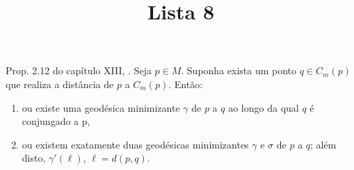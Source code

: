 



\title{Lista 8}
\maketitle

\label{section-phantom}



\noindent

\begin{exercise}
Prop. 2.12 do capítulo XIII, \cite{doc}. Seja $p \in M$. Suponha exista um ponto $q \in C_m(p)$ que realiza a distância de $p$ a $C_m(p)$. Então:
\begin{enumerate}
\item ou existe uma geodésica minimizante $\gamma$ de $p$ a $q$ ao longo da qual $q$ é conjungado a p,
\item ou existem exatamente duas geodésicas minimizantes $\gamma$ e $\sigma$ de $p$ a $q$; além disto, $\gamma'(\ell)$, $\ell=d(p,q)$.
\end{enumerate}
\end{exercise}







